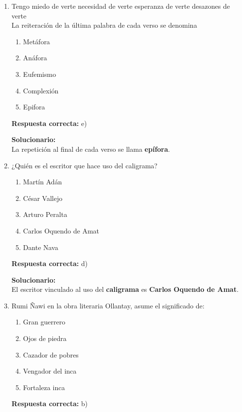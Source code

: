 \begin{enumerate}

	
	\item Tengo miedo de verte necesidad de verte esperanza de verte desazones de verte\\
	La reiteración de la última palabra de cada verso se denomina
	\begin{enumerate}[label=\alph*)]
		\item Metáfora
		\item Anáfora
		\item Eufemismo
		\item Complexión
		\item Epifora
	\end{enumerate}
	\textbf{Respuesta correcta:} e)
	
	\vspace{2mm}
	\textbf{Solucionario:}\\
	La repetición al final de cada verso se llama \textbf{epífora}.
	
	\vspace{6mm}
	
	\item ¿Quién es el escritor que hace uso del caligrama?
	\begin{enumerate}[label=\alph*)]
		\item Martín Adán
		\item César Vallejo
		\item Arturo Peralta
		\item Carlos Oquendo de Amat
		\item Dante Nava
	\end{enumerate}
	\textbf{Respuesta correcta:} d)
	
	\vspace{2mm}
	\textbf{Solucionario:}\\
	El escritor vinculado al uso del \textbf{caligrama} es \textbf{Carlos Oquendo de Amat}.
	
	\vspace{6mm}
	
	\item Rumi Ñawi en la obra literaria Ollantay, asume el significado de:
	\begin{enumerate}[label=\alph*)]
		\item Gran guerrero
		\item Ojos de piedra
		\item Cazador de pobres
		\item Vengador del inca
		\item Fortaleza inca
	\end{enumerate}
	\textbf{Respuesta correcta:} b)
	

\end{enumerate}
